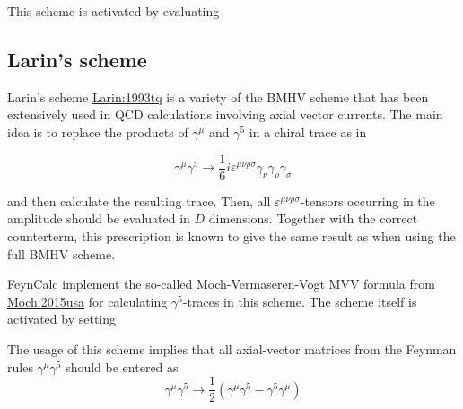 \documentclass[../FeynCalcManual.tex]{subfiles}
\begin{document}
This scheme is activated by evaluating

\begin{Shaded}
\begin{Highlighting}[]
\OperatorTok{[}\OperatorTok{]}
\end{Highlighting}
\end{Shaded}

\subsection{Larin's scheme}\label{larins-scheme}

Larin's scheme
\href{https://arxiv.org/pdf/hep-ph/9302240.pdf}{Larin:1993tq} is a
variety of the BMHV scheme that has been extensively used in QCD
calculations involving axial vector currents. The main idea is to
replace the products of \(\gamma^\mu\) and \(\gamma^5\) in a chiral
trace as in

\begin{equation}
\gamma^\mu \gamma^5 \to \frac{1}{6} i \varepsilon^{\mu \nu \rho \sigma} \gamma_\nu \gamma_\rho \gamma_\sigma
\end{equation}

and then calculate the resulting trace. Then, all
\(\varepsilon^{\mu \nu \rho \sigma}\)-tensors occurring in the amplitude
should be evaluated in \(D\) dimensions. Together with the correct
counterterm, this prescription is known to give the same result as when
using the full BMHV scheme.

FeynCalc implement the so-called Moch-Vermaseren-Vogt MVV formula from
\href{https://arxiv.org/pdf/1506.04517.pdf}{Moch:2015usa} for
calculating \(\gamma^5\)-traces in this scheme. The scheme itself is
activated by setting

\begin{Shaded}
\begin{Highlighting}[]
\OperatorTok{[}\OperatorTok{]}
\end{Highlighting}
\end{Shaded}

The usage of this scheme implies that all axial-vector matrices from the
Feynman rules \(\gamma^\mu \gamma^5\) should be entered as
\begin{equation}
\gamma^\mu \gamma^5 \to \frac{1}{2} \left ( \gamma^\mu \gamma^5 -  \gamma^5 \gamma^\mu \right )
\end{equation}
\end{document}
